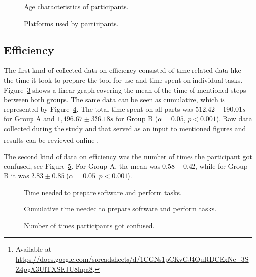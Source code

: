 \begin{figure}[H]
    
    \caption{Age characteristics of participants.}
    \label{fig:plot-age}
\end{figure}

\begin{figure}[H]
    
    \caption{Platforms used by participants.}
    \label{fig:plot-platform}
\end{figure}

\subsection{Efficiency}
\label{sec:evaluation-efficiency}

The first kind of collected data on efficiency consisted of time-related data like the time it took to prepare the tool for use and time spent on individual tasks.
Figure~\ref{fig:plot-linear} shows a linear graph covering the mean of the time of mentioned steps between both groups.
The same data can be seen as cumulative, which is represented by Figure~\ref{fig:plot-stacked-bar}.
The total time spent on all parts was $512.42 \pm 190.01 s$ for Group A and $1,496.67 \pm 326.18 s$ for Group B ($\alpha=0.05$, $p<0.001$).
Raw data collected during the study and that served as an input to mentioned figures and results can be reviewed online\footnote{Available at \url{https://docs.google.com/spreadsheets/d/1CGNs1pCKvGJ4QuRDCExNc_3SZ4pgX3UlTXSKJU8hpa8}.}.

The second kind of data on efficiency was the number of times the participant got confused, see Figure~\ref{fig:plot-boxplot}.
For Group A, the mean was $0.58 \pm 0.42$, while for Group B it was $2.83 \pm 0.85$ ($\alpha=0.05$, $p<0.001$).

\begin{figure}[H]
    
    \caption{Time needed to prepare software and perform tasks.}
    \label{fig:plot-linear}
\end{figure}

\begin{figure}[H]
    
    \caption{Cumulative time needed to prepare software and perform tasks.}
    \label{fig:plot-stacked-bar}
\end{figure}

\begin{figure}[H]
    
    \caption{Number of times participants got confused.}
    \label{fig:plot-boxplot}
\end{figure}

